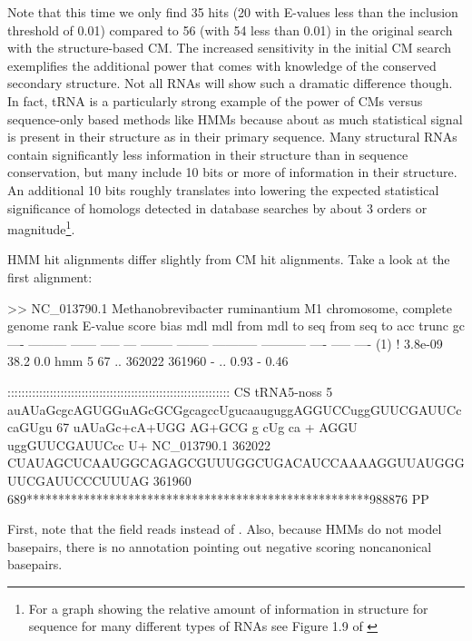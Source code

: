 Note that this time we only find 35 hits (20 with E-values less than
the inclusion threshold of 0.01) compared to 56 (with 54 less than
0.01) in the original search with the structure-based CM. The
increased sensitivity in the initial CM search exemplifies the
additional power that comes with knowledge of the conserved secondary
structure. Not all RNAs will show such a dramatic difference
though. In fact, tRNA is a particularly strong example of the power of
CMs versus sequence-only based methods like HMMs because about as much
statistical signal is present in their structure as in their primary
sequence. Many structural RNAs contain significantly less information
in their structure than in sequence conservation, but many include 10
bits or more of information in their structure. An additional 10 bits
roughly translates into lowering the expected statistical significance
of homologs detected in database searches by about 3 orders or
magnitude\footnote{For a graph showing the relative amount of
information in structure for sequence for many different types of RNAs
see Figure 1.9 of \citep{Nawrocki09}}.

HMM hit alignments differ slightly from CM hit alignments. Take a look
at the first alignment:

\begin{sreoutput}
>> NC_013790.1  Methanobrevibacter ruminantium M1 chromosome, complete genome
 rank     E-value  score  bias mdl mdl from   mdl to       seq from      seq to       acc trunc   gc
 ----   --------- ------ ----- --- -------- --------    ----------- -----------      ---- ----- ----
  (1) !   3.8e-09   38.2   0.0 hmm        5       67 ..      362022      361960 - .. 0.93     - 0.46

                     ::::::::::::::::::::::::::::::::::::::::::::::::::::::::::::::: CS
   tRNA5-noss      5 auAUaGcgcAGUGGuAGcGCGgcagccUgucaauguggAGGUCCuggGUUCGAUUCccaGUgu 67    
                      uAUaGc+cA+UGG AG+GCG   g cUg ca  +   AGGU  uggGUUCGAUUCcc  U+ 
  NC_013790.1 362022 CUAUAGCUCAAUGGCAGAGCGUUUGGCUGACAUCCAAAAGGUUAUGGGUUCGAUUCCCUUUAG 361960
                     689******************************************************988876 PP
\end{sreoutput}

First, note that the  field reads  instead of
. Also, because HMMs do not model basepairs, there is no
 annotation pointing out negative scoring noncanonical
basepairs.

